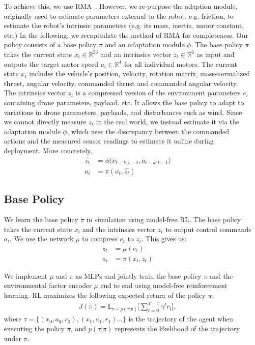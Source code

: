  To achieve this, we use RMA~\cite{kumar2021rma}. However, we re-purpose the adaption module, originally used to estimate parameters external to the robot, e.g. friction, to estimate the robot's intrinsic parameters (e.g. its mass, inertia, motor constant, etc.) In the following, we recapitulate the method of RMA for completeness. Our policy consists of a base policy $\pi$ and an adaptation module $\phi$. The base policy $\pi$ takes the current state $x_t \in \mathbb{R}^{23}$ and an intrinsics vector $z_t \in \mathbb{R}^6$ as input and outputs the target motor speed $a_t \in \mathbb{R}^4$ for all individual motors. The current state $x_t$ includes the vehicle's position, velocity, rotation matrix, mass-normalized thrust, angular velocity, commanded thrust and commanded angular velocity. The intrinsics vector $z_t$ is a compressed version of the environment parameters $e_t$ containing drone parameters, payload, etc. It allows the base policy to adapt to variations in drone parameters, payloads, and disturbances such as wind. Since we cannot directly measure $z_t$ in the real world, we instead estimate it via the adaptation module $\phi$, which uses the discrepancy between the commanded actions and the measured sensor readings to estimate it online during deployment. More concretely, 
\begin{align}
    \hat{z_t} &=  \phi\big(x_{t-k:t-1}, a_{t-k:t-1}\big) \\
    a_t &= \pi(x_t, \hat{z_t}) \label{eq:pi}
\end{align}

\subsection{Base Policy}
We learn the base policy $\pi$ in simulation using model-free RL. The base policy takes the current state $x_t$ and the intrinsics vector $z_t$ to output control commands $a_t$. We use the network $\mu$ to compress $e_t$ to $z_t$. This gives us:
\begin{align}
        z_t &= \mu(e_t) \\  
        a_t &= \pi(x_t, z_t)
\end{align}


We implement $\mu$ and $\pi$ as MLPs and jointly train the base policy $\pi$ and the environmental factor encoder $\mu$ end to end using model-free reinforcement learning. RL maximizes the following expected return of the policy $\pi$: 
\begin{align}
    J(\pi) = \mathbb{E}_{\tau \sim p(\tau|\pi)}\Bigg[\sum_{t=0}^{T-1}\gamma^t r_t\Bigg],
\end{align}
where $\tau = \{(x_0, a_0, r_0), (x_1, a_1, r_1) . . .\}$ is the trajectory of the agent when executing the policy $\pi$, and $p(\tau|\pi)$ represents the likelihood of the trajectory under $\pi$.

